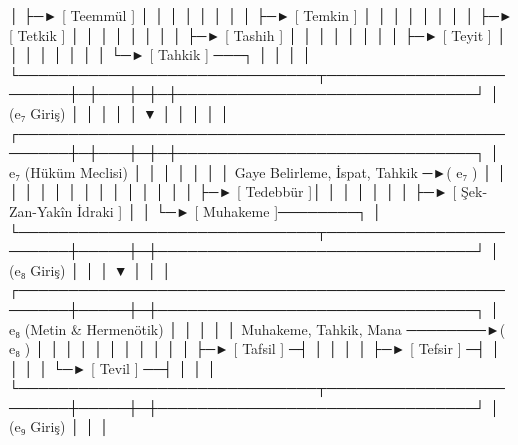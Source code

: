 \documentclass[11pt,a4paper]{article}
\begin{document}
│                                       ├─► [ Teemmül ] │ │ │ │ │ │                              │
│                                       ├─► [ Temkin ]  │ │ │ │ │ │                              │
│                                       ├─► [ Tetkik ]  │ │ │ │ │ │                              │
│                                       ├─► [ Tashih ]  │ │ │ │ │ │                              │
│                                       ├─► [ Teyit ]   │ │ │ │ │ │                              │
│                                       └─► [ Tahkik ] ───┐   │ │ │                              │
└──────────────────────────────┬────────────────────────┼─┼───┼─┼─┼──────────────────────────────┘
                               │ (e₇ Giriş)             │ │   │ │ │
                               ▼                        │ │   │ │ │
┌───────────────────────────────────────────────────────┼─┼───┼─┼─┼──────────────────────────────┐
│  e₇ (Hüküm Meclisi)                                   │ │   │ │ │                              │
│  { Gaye Belirleme, İspat, Tahkik } ─►( e₇ )           │ │   │ │ │                              │
│                                       │               │ │   │ │ │                              │
│                                       ├─► [ Tedebbür ]│ │   │ │ │                              │
│                                       ├─► [ Şek-Zan-Yakîn İdraki ]                             │
│                                       └─► [ Muhakeme ]────────┐                                │
└──────────────────────────────┬────────────────────────┼─────┼─┼────────────────────────────────┘
                               │ (e₈ Giriş)             │     │ │
                               ▼                        │     │ │
┌───────────────────────────────────────────────────────┼─────┼─┼────────────────────────────────┐
│  e₈ (Metin & Hermenötik)                              │     │ │                                │
│  { Muhakeme, Tahkik, Mana } ────────►( e₈ )           │     │ │                                │
│                                       │               │     │ │                                │
│                                       ├─► [ Tafsil ] ─┤     │ │                                │
│                                       ├─► [ Tefsir ] ─┤     │ │                                │
│                                       └─► [ Tevil ] ──┤     │ │                                │
└──────────────────────────────┬────────────────────────┼─────┼─┼────────────────────────────────┘
                               │ (e₉ Giriş)             │     │ │
\end{document}

